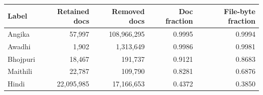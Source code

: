 \begin{tabular}{lrrrr}
\toprule
Label & Retained docs & Removed docs & Doc fraction & File-byte fraction \\
\midrule
Angika & 57,997 & 108,966,295 & 0.9995 & 0.9994 \\
Awadhi & 1,902 & 1,313,649 & 0.9986 & 0.9981 \\
Bhojpuri & 18,467 & 191,737 & 0.9121 & 0.8683 \\
Maithili & 22,787 & 109,790 & 0.8281 & 0.6876 \\
Hindi & 22,095,985 & 17,166,653 & 0.4372 & 0.3850 \\
\bottomrule
\end{tabular}
